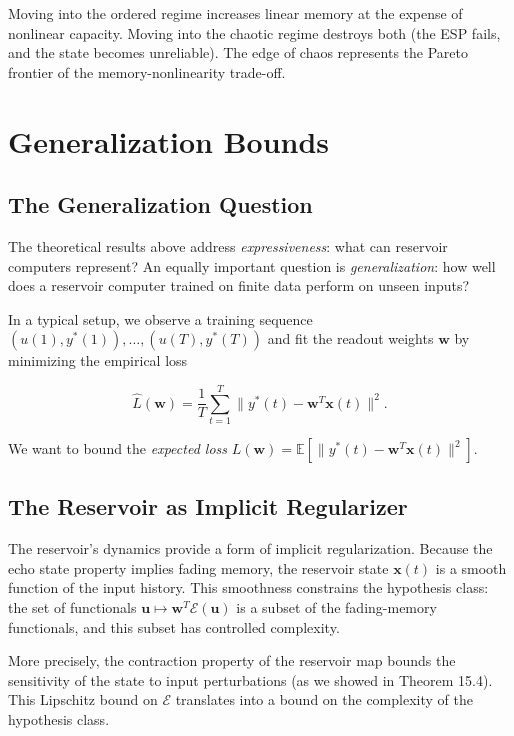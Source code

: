 Moving into the ordered regime increases linear memory at the expense of nonlinear
capacity. Moving into the chaotic regime destroys both (the ESP fails, and the state
becomes unreliable). The edge of chaos represents the Pareto frontier of the
memory-nonlinearity trade-off.


\bigskip


\section{Generalization Bounds}\label{sec:15.8}

\subsection{The Generalization Question}\label{sec:15.8.1}

The theoretical results above address \textit{expressiveness}: what can reservoir computers
represent? An equally important question is \textit{generalization}: how well does a
reservoir computer trained on finite data perform on unseen inputs?

In a typical setup, we observe a training sequence $(u(1), y^*(1)), \ldots, (u(T), y^*(T))$
and fit the readout weights $\mathbf{w}$ by minimizing the empirical loss

\[
\hat{L}(\mathbf{w}) = \frac{1}{T} \sum_{t=1}^{T} \|y^*(t) - \mathbf{w}^T \mathbf{x}(t)\|^2.
\]

We want to bound the \textit{expected loss} $L(\mathbf{w}) = \mathbb{E}[\|y^*(t) - \mathbf{w}^T \mathbf{x}(t)\|^2]$.

\subsection{The Reservoir as Implicit Regularizer}\label{sec:15.8.2}

The reservoir's dynamics provide a form of implicit regularization. Because the echo
state property implies fading memory, the reservoir state $\mathbf{x}(t)$ is a smooth
function of the input history. This smoothness constrains the hypothesis class: the
set of functionals $\mathbf{u} \mapsto \mathbf{w}^T \mathcal{E}(\mathbf{u})$ is a subset
of the fading-memory functionals, and this subset has controlled complexity.

More precisely, the contraction property of the reservoir map bounds the sensitivity
of the state to input perturbations (as we showed in Theorem 15.4). This Lipschitz
bound on $\mathcal{E}$ translates into a bound on the complexity of the hypothesis
class.

